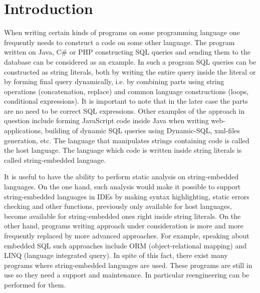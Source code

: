 \documentclass{sig-alternate-05-2015}
\begin{document}

\printccsdesc


\section{Introduction}
When writing certain kinds of programs on some programming language one frequently needs to construct a code on some other language. The program written on Java, C\# or PHP constructing SQL queries and sending them to the database can be considered as an example. In such a program SQL queries can be constructed as string literals, both by writing the entire query inside the literal or by forming final query dynamically, i.e. by combining parts using string operations (concatenation, replace) and common language constructions (loops, conditional expressions). It is important to note that in the later case the parts are no need to be correct SQL expressions. Other examples of the approach in question include forming JavaScript code inside Java when writing web-applications, building of dynamic SQL queries using Dynamic-SQL, xml-files generation, etc. The language that manipulates strings containing code is called the host language. The language which code is written inside string literals is called string-embedded language.

It is useful to have the ability to perform static analysis on string-embedded languages. On the one hand, such analysis would make it possible to support string-embedded languages in IDEs by making syntax highlighting, static errors checking and other functions, previously only available for host languages, become available for string-embedded ones right inside string literals. On the other hand, programs writing approach under consideration is more and more frequently replaced by more advanced approaches. For example, speaking about embedded SQL such approaches include ORM (object-relational mapping) and LINQ (language integrated query). In spite of this fact, there exist many programs where string-embedded languages are used. These programs are still in use so they need a support and maintenance. In particular reengineering can be performed for them. 
\end{document}
